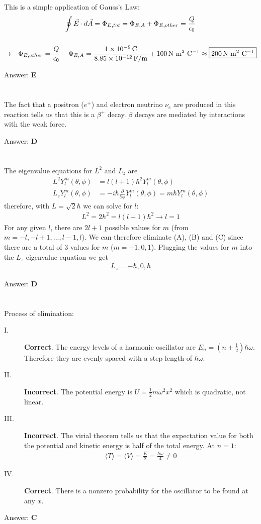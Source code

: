 \documentclass[12pt]{article}
\newcommand{\Answer}[1]{Answer: \textbf{#1}}
\newcommand{\Problem}[3]{
    \setcounter{section}{#1}
    \addtocounter{section}{-1}
    \section{}
    #3\par\par
    \Answer{#2}
}
\begin{document}
\Problem{62}{E}{%
This is a simple application of Gauss's Law:
\begin{gather}
\oint \vec{E} \cdot d\vec{A} = \Phi_{E, tot} =  \Phi_{E, A}  + \Phi_{E, other} = \frac{Q}{\epsilon_{0}}\\
\nonumber\\
\rightarrow \hspace{.1in} \Phi_{E, other} = \frac{Q}{\epsilon_{0}} -  \Phi_{E, A}  = \frac{1\times 10^{-9}\,\text{C}}
{8.85\times 10^{-12}\,\text{F/m}} + 100\,\text{N m$^{2}$ C$^{-1}$} \approx \boxed{200\,\text{N m$^{2}$ C$^{-1}$}}\nonumber
\end{gather}
}


\Problem{63}{D}{%
The fact that a positron ($e^{+}$) and electron neutrino ${\nu_{e}}$ are produced in this reaction tells us that this is a $\beta^{+}$ decay. $\beta$ decays are mediated by interactions with the weak force.
}

\Problem{64}{D}{%
The eigenvalue equations for $L^{2}$ and $L_{z}$ are
\begin{align}
L^{2} Y^{m}_{l}(\theta, \phi) &= l (l + 1) \hbar^{2} Y^{m}_{l}(\theta, \phi)\\
L_{z} Y^{m}_{l}(\theta, \phi) &= -i \hbar \frac{\partial}{\partial \phi} Y^{m}_{l}(\theta, \phi) = m \hbar Y^{m}_{l}(\theta, \phi)
\end{align}
therefore, with $L = \sqrt{2} \hbar$ we can solve for $l$:
\begin{align}
L^{2} = 2 \hbar^{2} = l (l +1) \hbar^{2} \rightarrow l = 1\nonumber
\end{align}
For any given $l$, there are $2 l +1$ possible values for $m$ (from $m = - l, - l + 1, ... , l - 1, l$). We can therefore eliminate (A), (B) and (C) since there are a total of 3 values for $m$ ($m = -1, 0, 1$). Plugging the values for $m$ into the $L_{z}$ eigenvalue equation we get
\begin{align}
\boxed{L_{z} = -\hbar, 0, \hbar}\nonumber
\end{align}
}


\Problem{65}{C}{%
Process of elimination:
\begin{description}
\item[I.] \textbf{Correct}. The energy levels of a harmonic oscillator are $E_{n} = \left( n +\frac{1}{2}\right)\hbar \omega$. Therefore they are evenly spaced with a step length of $\hbar \omega$.
\item[II.] \textbf{Incorrect}. The potential energy is $U = \frac{1}{2} m \omega^{2} x^{2}$ which is quadratic, not linear.
\item[III.] \textbf{Incorrect}. The virial theorem tells us that the expectation value for both the potential and kinetic energy is half of the total energy. At $n =1$:\\
\begin{align}
\langle T \rangle = \langle V \rangle = \frac{E}{2} = \frac{\hbar \omega}{4} \neq 0\nonumber
\end{align}
\item[IV.] \textbf{Correct}. There is a nonzero probability for the oscillator to be found at any $x$.\\
\end{description}
}
\end{document}
